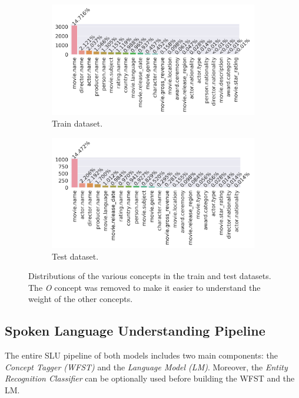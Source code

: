 \documentclass[11pt,a4paper]{article}
\begin{document}
\begin{figure}
	\begin{subfigure}[b]{0.5\linewidth}
		\includegraphics[width=\linewidth]{img/train-concepts-distribution}
		\caption{Train dataset.}
	\end{subfigure}
	\begin{subfigure}[b]{0.5\linewidth}
	\includegraphics[width=\textwidth]{img/test-concepts-distribution}
	\caption{Test dataset.}
	\end{subfigure}
	\caption{Distributions of the various concepts in the train and test datasets. The \textit{O} concept was removed to make it easier to understand the weight of the other concepts.}
	\label{fig:concept-distribution}
\end{figure}

\subsection{Spoken Language Understanding Pipeline}

The entire SLU pipeline of both models includes two main components: the \textit{Concept Tagger (WFST)} and the \textit{Language Model (LM)}. Moreover, the \textit{Entity Recognition Classifier} can be optionally used before building the WFST and the LM. 
\end{document}
